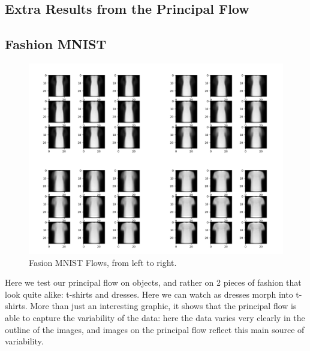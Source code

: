 \documentclass[12pt]{report}
\begin{document}
\begin{appendices}
\chapter{Extra Results from the Principal Flow}

\section{Fashion MNIST}
\begin{figure}[ht]
    \begin{center}
        \includegraphics[scale=0.3]{main_fashion.png}
        \caption{Fasion MNIST Flows, from left to right.}
        \label{fig:fashionmnistflows}
    \end{center}
\end{figure}
Here we test our principal flow on objects, and rather on 2 pieces of fashion that
look quite alike: t-shirts and dresses.
Here we can watch as dresses morph into t-shirts. More than just an interesting graphic,
it shows that the principal flow is able to capture the variability of the data:
here the data varies very clearly in the outline of the images, and images on the
principal flow reflect this main source of variability.


\end{appendices}
\end{document}
